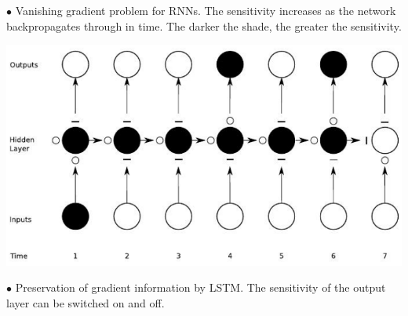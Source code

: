\documentclass[letterpaper, 10.5pt,landscape]{article}
\begin{document}
\begin{multicols*}{3}
\vspace{-5pt}
$\bullet$ Vanishing gradient problem for RNNs. The sensitivity increases as the network backpropagates through in time. The darker the shade, the greater the sensitivity.
\vspace{-5pt}

\begin{center}
    \begin{minipage}{0.75\linewidth}
    \includegraphics[width=\textwidth]{figures/LSTMBackprop.png}
    \end{minipage}
\end{center}
\vspace{-5pt}
$\bullet$ Preservation of gradient information by LSTM. The sensitivity of the output layer can be switched on and off.

\vspace{2pt}







\end{multicols*}
\end{document}

